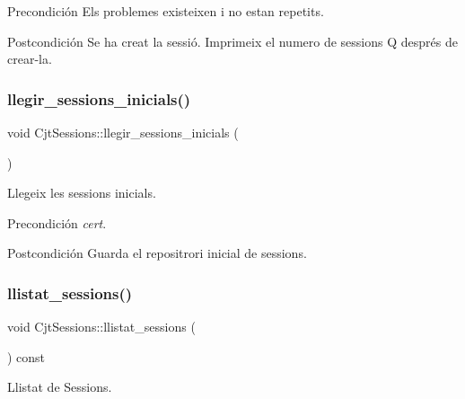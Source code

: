 \begin{DoxyPrecond}{Precondición}
Els problemes existeixen i no estan repetits. 
\end{DoxyPrecond}
\begin{DoxyPostcond}{Postcondición}
Se ha creat la sessió. Imprimeix el numero de sessions Q després de crear-\/la. 
\end{DoxyPostcond}
\mbox{\label{class_cjt_sessions_a4ea0fafab13c9db8fe385f62fb572fc0}} 
\subsubsection{\texorpdfstring{llegir\+\_\+sessions\+\_\+inicials()}{llegir\_sessions\_inicials()}}
{\footnotesize\ttfamily void Cjt\+Sessions\+::llegir\+\_\+sessions\+\_\+inicials (\begin{DoxyParamCaption}{ }\end{DoxyParamCaption})}



Llegeix les sessions inicials. 

\begin{DoxyPrecond}{Precondición}
{\itshape cert}. 
\end{DoxyPrecond}
\begin{DoxyPostcond}{Postcondición}
Guarda el repositrori inicial de sessions. 
\end{DoxyPostcond}
\mbox{\label{class_cjt_sessions_a1e4f04be3e5da3d8f9091620d56ea355}} 
\subsubsection{\texorpdfstring{llistat\+\_\+sessions()}{llistat\_sessions()}}
{\footnotesize\ttfamily void Cjt\+Sessions\+::llistat\+\_\+sessions (\begin{DoxyParamCaption}{ }\end{DoxyParamCaption}) const}



Llistat de Sessions. 

